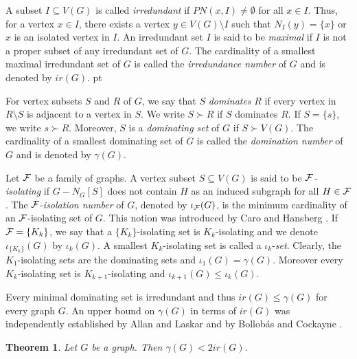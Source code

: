 \documentclass[11pt]{article}
\newtheorem{thm}{Theorem}
\newcommand{\cF}{{\cal F}}
\newcommand{\2}{ \vspace{0.2cm} }
\newcommand{\1}{ \vspace{0.1cm} }
\begin{document}
A subset $I \subseteq V(G)$ is called \emph{irredundant} if $PN(x, I) \neq \emptyset$ for all $x \in I$. Thus, for a vertex $x \in I$, there exists a vertex $y \in V(G) \setminus I$ such that $N_{I}(y) = \{x\}$ or $x$ is an isolated vertex in $I$. An irredundant set $I$ is said to be \emph{maximal} if $I$ is not a proper subset of any irredundant set of $G$. The cardinality of a smallest maximal irredundant set of $G$ is called the \emph{irredundance number} of $G$ and is denoted by $ir(G)$.
 pt




For vertex subsets $S$ and $R$ of $G$, we say that $S$ \emph{dominates} $R$ if every vertex in $R \setminus S$ is adjacent to a vertex in $S$. We write $S \succ R$ if $S$ dominates $R$. If $S = \{s\}$, we write $s \succ R$. Moreover, $S$ is a \emph{dominating set} of $G$ if $S \succ V(G)$. The cardinality of a smallest dominating set of $G$ is called the \emph{domination number} of $G$ and is denoted by $\gamma(G)$.

 Let $\cF$ be a family of graphs. A vertex subset $S \subseteq V(G)$ is said to be
$\cF$\emph{-isolating} if $G -  N_{G}[S]$ does not contain $H$ as an induced subgraph for all $H \in \cF$.
The $\cF$-\emph{isolation number} of $G$, denoted by $\iota_{\cF}(G)$, is the minimum cardinality of an $\cF$-isolating set of $G$.
This notion was introduced by Caro and Hansberg \cite{CaHa17}. If $\cF = \{K_{k}\}$, we say that a $\{K_k\}$-isolating set is $K_k$-isolating and we denote $\iota_{\{K_{k}\}}(G)$ by $\iota_{k}(G)$. A smallest $K_{k}$-isolating set is called a $\iota_{k}$-\emph{set}. Clearly, the $K_1$-isolating sets are the dominating sets and $\iota _1(G)=\gamma(G).$ Moreover every $K_k$-isolating set is $K_{k+1}$-isolating and $\iota_{k+1}(G)\le \iota_k(G)$.


Every minimal dominating set is irredundant and thus $ir(G)\le \gamma (G)$ for every graph $G$.
An upper bound on $\gamma(G)$ in terms of $ir(G)$ was independently established by Allan and Laskar \cite{AL1978} and by Bollob\'{a}s and Cockayne \cite{BoCo1979}.

\begin{thm}\label{thm CoBo}\cite{AL1978, BoCo1979}
Let $G$ be a graph. Then
$\gamma(G) < 2ir(G)$.
\end{thm}
\end{document}
